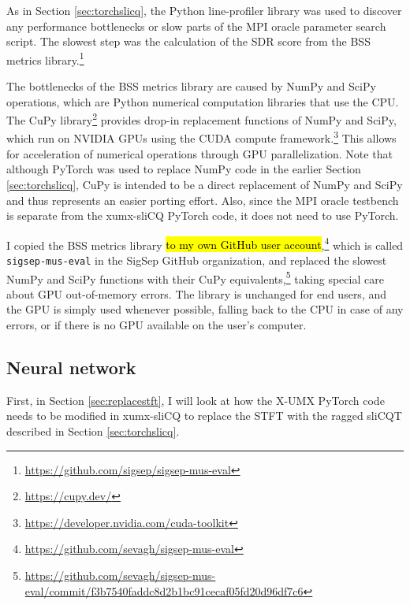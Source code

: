 \documentclass[report.tex]{subfiles}
\begin{document}
As in Section \ref{sec:torchslicq}, the Python line-profiler library was used to discover any performance bottlenecks or slow parts of the MPI oracle parameter search script. The slowest step was the calculation of the SDR score from the BSS metrics library.\footnote{\url{https://github.com/sigsep/sigsep-mus-eval}}

The bottlenecks of the BSS metrics library are caused by NumPy and SciPy operations, which are Python numerical computation libraries that use the CPU. The CuPy library\footnote{\url{https://cupy.dev/}} provides drop-in replacement functions of NumPy and SciPy, which run on NVIDIA GPUs using the CUDA compute framework.\footnote{\url{https://developer.nvidia.com/cuda-toolkit}} This allows for acceleration of numerical operations through GPU parallelization. Note that although PyTorch was used to replace NumPy code in the earlier Section \ref{sec:torchslicq}, CuPy is intended to be a direct replacement of NumPy and SciPy and thus represents an easier porting effort. Also, since the MPI oracle testbench is separate from the xumx-sliCQ PyTorch code, it does not need to use PyTorch.

I copied the BSS metrics library \hl{to my own GitHub user account},\footnote{\url{https://github.com/sevagh/sigsep-mus-eval}} which is called \Verb#sigsep-mus-eval# in the SigSep GitHub organization, and replaced the slowest NumPy and SciPy functions with their CuPy equivalents,\footnote{\url{https://github.com/sevagh/sigsep-mus-eval/commit/f3b7540faddc8d2b1bc91cecaf05fd20d96df7c6}} taking special care about GPU out-of-memory errors. The library is unchanged for end users, and the GPU is simply used whenever possible, falling back to the CPU in case of any errors, or if there is no GPU available on the user's computer.


\newpagefill

\subsection{Neural network}
\label{sec:neuralnet}

First, in Section \ref{sec:replacestft}, I will look at how the X-UMX PyTorch code needs to be modified in xumx-sliCQ to replace the STFT with the ragged sliCQT described in Section \ref{sec:torchslicq}.
\end{document}
